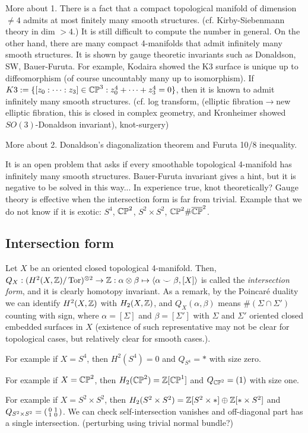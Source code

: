 \documentclass{../../../small}
\begin{document}
More about 1.
There is a fact that a compact topological manifold of dimension $\ne4$ admits at most finitely many smooth structures.
(cf. Kirby-Siebenmann theory in dim $>4$.)
It is still difficult to compute the number in general.
On the other hand, there are many compact 4-manifolds that admit infinitely many smooth structures.
It is shown by gauge theoretic invariants such as Donaldson, SW, Bauer-Furuta.
For example, Kodaira showed the K3 surface is unique up to diffeomorphism (of course uncountably many up to isomorphism).
If $K3:=\{[z_0:\cdots:z_3]\in\CP^3:z_0^4+\cdots+z_3^4=0\}$, then it is known to admit infinitely many smooth structures.
(cf. log transform, (elliptic fibration$\to$new elliptic fibration, this is closed in complex geometry, and Kronheimer showed $SO(3)$-Donaldson invariant), knot-surgery)

More about 2.
Donaldson's diagonalization theorem and Furuta 10/8 inequality.


It is an open problem that asks if every smoothable topological 4-manifold has infinitely many smooth structures.
Bauer-Furuta invariant gives a hint, but it is negative to be solved in this way...
In experience true, knot theoretically?
Gauge theory is effective when the intersection form is far from trivial.
Example that we do not know if it is exotic: $S^4$, $\CP^2$, $S^2\times S^2$, $\CP^2\#\bar\CP^2$.

\subsection{Intersection form}

Let $X$ be an oriented closed topological 4-manifold.
Then, $Q_X:(H^2(X,\Z)/\Tor)^{\otimes2}\to\Z:\alpha\otimes\beta\mapsto\<\alpha\smile\beta,[X]\>$ is called the \emph{intersection form}, and it is clearly homotopy invariant.
As a remark, by the Poincar\'e duality we can identify $H^2(X,\Z)$ with $H_2(X,\Z)$, and $Q_X(\alpha,\beta)$ means $\#(\Sigma\cap\Sigma')$ counting with sign, where $\alpha=[\Sigma]$ and $\beta=[\Sigma']$ with $\Sigma$ and $\Sigma'$ oriented closed embedded surfaces in $X$ (existence of such representative may not be clear for topological cases, but relatively clear for smooth cases.).

For example if $X=S^4$, then $H^2(S^4)=0$ and $Q_{S^4}=*$ with size zero.

For example if $X=\CP^2$, then $H_2(\CP^2)=\Z[\CP^1]$ and $Q_{\CP^2}=(1)$ with size one.

For example if $X=S^2\times S^2$, then $H_2(S^2\times S^2)=\Z[S^2\times*]\oplus\Z[*\times S^2]$ and $Q_{S^2\times S^2}=\left(\mat[small]{0&1\\1&0}\right)$.
We can check self-intersection vanishes and off-diagonal part has a single intersection. (perturbing using trivial normal bundle?)
\end{document}
